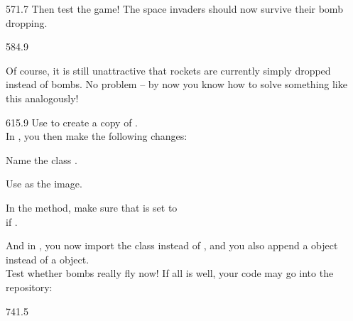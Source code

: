 \documentclass{aslab}
\begin{document}
\begin{region}[x=74.7,right=0]{571.7}
Then test the game! The space invaders should now survive their bomb
dropping.
\end{region}

\begin{region}[pitch=13.2]{584.9}
\begin{plaintasks}[start=3]
\item Of course, it is still unattractive that rockets are currently simply
  dropped instead of bombs. No problem -- by now you know how to solve
  something like this analogously!
\end{plaintasks}
\end{region}

\begin{region}[x=74.7,right=0,pitch=13.5]{615.9}
Use  to create a copy of .\\
In , you then make the following changes:
\begin{steps}
\item Name the class .
\item Use  as the image.
\item In the  method, make sure that  is set to
  \\ if .
\end{steps}
And in , you now import the class  instead of
, and you also append a  object instead of a
 object.\\
Test whether bombs really fly now! If all is well, your code may go into
the repository:
\end{region}

\begin{region}[x=74.7,right=0,pitch=13.35]{741.5}
\\
\\
\end{region}
\end{document}
